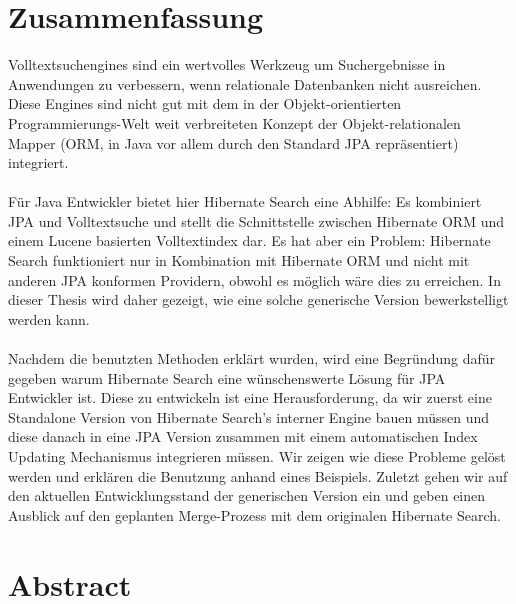 \section*{Zusammenfassung}
Volltextsuchengines sind ein wertvolles Werkzeug um Suchergebnisse in Anwendungen zu verbessern, wenn relationale Datenbanken nicht ausreichen. Diese Engines sind nicht gut mit dem in der Objekt-orientierten Programmierungs-Welt weit verbreiteten Konzept der Objekt-relationalen Mapper (ORM, in Java vor allem durch den Standard JPA repräsentiert) integriert. 
\\\\
Für Java Entwickler bietet hier Hibernate Search eine Abhilfe: Es kombiniert JPA und Volltextsuche und stellt die Schnittstelle zwischen Hibernate ORM und einem Lucene basierten Volltextindex dar. Es hat aber ein Problem: Hibernate Search funktioniert nur in Kombination mit Hibernate ORM und nicht mit anderen JPA konformen Providern, obwohl es möglich wäre dies zu erreichen. In dieser Thesis wird daher gezeigt, wie eine solche generische Version bewerkstelligt werden kann.
\\\\
Nachdem die benutzten Methoden erklärt wurden, wird eine Begründung dafür gegeben warum Hibernate Search eine wünschenswerte Lösung für JPA Entwickler ist. Diese zu entwickeln ist eine Herausforderung, da wir zuerst eine Standalone Version von Hibernate Search's interner Engine bauen müssen und diese danach in eine JPA Version zusammen mit einem automatischen Index Updating Mechanismus integrieren müssen. Wir zeigen wie diese Probleme gelöst werden und erklären die Benutzung anhand eines Beispiels. Zuletzt gehen wir auf den aktuellen Entwicklungsstand der generischen Version ein und geben einen Ausblick auf den geplanten Merge-Prozess mit dem originalen Hibernate Search.

\pagebreak

\section*{Abstract}

